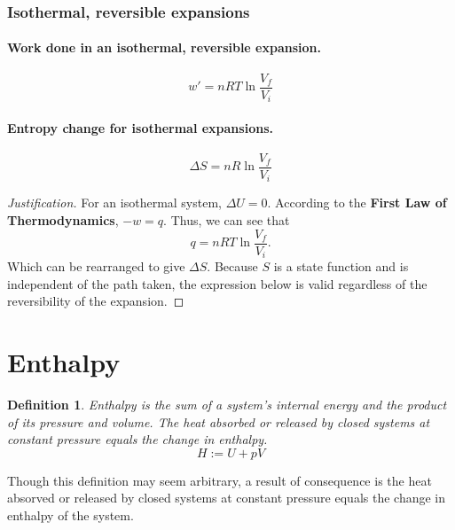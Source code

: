 \documentclass{article}
\numberwithin{theorem}{section}
\numberwithin{corollary}{section}
\numberwithin{postulate}{section}
\numberwithin{lemma}{section}
\newtheorem{definition}{Definition}
\numberwithin{definition}{section}
\newenvironment{justification} {\begin{proof}[Justification]} {\end{proof}}
\begin{document}
\subsubsection{Isothermal, reversible expansions}

\paragraph{Work done in an isothermal, reversible expansion. }

\begin{equation}
  w' = nRT\ln{\frac{V_f}{V_i}}
\end{equation}

\paragraph{Entropy change for isothermal expansions. }

\begin{equation}
  \Delta S = nR \ln{\frac{V_f}{V_i}}
\end{equation}

\begin{justification}
  For an isothermal system, $\Delta U = 0$. According to the \textbf{First Law
  of Thermodynamics}, $-w = q$. Thus, we can see that
  \begin{equation*}
      q = nRT\ln{\frac{V_f}{V_i}}.
  \end{equation*} Which can be rearranged to give $\Delta S$. Because $S$ is a
  state function and is independent of the path taken, the expression below is
  valid regardless of the reversibility of the expansion.
\end{justification}

\section{Enthalpy}

\begin{definition}
  Enthalpy is the sum of a system's internal energy and the product of its pressure and
  volume. The heat absorbed or released by closed systems at constant pressure
  equals the change in enthalpy.
  \begin{equation}
   H := U + pV
  \end{equation}
\end{definition}

Though this definition may seem arbitrary, a result of consequence is the heat
absorved or released by closed systems at constant pressure equals the change in
enthalpy of the system.
\end{document}
